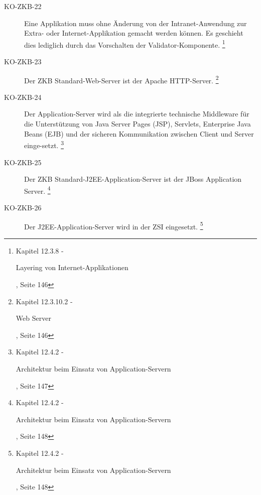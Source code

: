 \documentclass[
11pt, %
a4paper, %
BCOR25mm, %
DIV14, %
footsepline = false, %
headsepline, %
twoside, %
openright,
abstracton, %
listof=totocnumbered, %
bibliography=totocnumbered %
]{scrreprt}
\begin{document}
\begin{description}
    \item[KO-ZKB-22] Eine Applikation muss ohne Änderung von der
    Intranet-Anwendung zur Extra- oder Internet-Applikation gemacht werden können. Es geschieht
    dies lediglich durch das Vorschalten der Validator-Komponente.
    \footnote{\cite{ZkbHandbuchDerItArchitektur} Kapitel 12.3.8 -
    \begin{itshape}Layering von Internet-Applikationen\end{itshape}, Seite 146}
    
    \item[KO-ZKB-23] Der ZKB Standard-Web-Server ist der Apache HTTP-Server.
    \footnote{\cite{ZkbHandbuchDerItArchitektur} Kapitel 12.3.10.2 -
    \begin{itshape}Web Server\end{itshape}, Seite 146}
    
    \item[KO-ZKB-24] Der Application-Server wird als die integrierte technische
    Middleware für die Unterstützung von Java Server Pages (JSP), Servlets,
    Enterprise Java Beans (EJB) und der sicheren Kommunikation zwischen Client
    und Server einge-setzt.
    \footnote{\cite{ZkbHandbuchDerItArchitektur} Kapitel 12.4.2 -
    \begin{itshape}Architektur beim Einsatz von
    Application-Servern\end{itshape}, Seite 147}
    
    \item[KO-ZKB-25] Der ZKB Standard-J2EE-Application-Server ist der JBoss
    Application Server.
    \footnote{\cite{ZkbHandbuchDerItArchitektur} Kapitel 12.4.2 -
    \begin{itshape}Architektur beim Einsatz von
    Application-Servern\end{itshape}, Seite 148}
    
    \item[KO-ZKB-26] Der J2EE-Application-Server wird in der ZSI eingesetzt.
    \footnote{\cite{ZkbHandbuchDerItArchitektur} Kapitel 12.4.2 -
    \begin{itshape}Architektur beim Einsatz von
    Application-Servern\end{itshape}, Seite 148}
    

\end{description}
\end{document}
